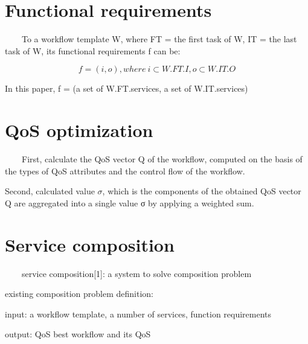 \documentclass[senior,final,11pt]{iscs-thesis}
\begin{document}


\section{Functional requirements}

~~~~To a workflow template W,  where  FT = the first task of W, IT = the last task of W, its functional requirements f can be:

\[f = (i,o), where~i \subset W.FT.I, o \subset W.IT.O \]
\begin{center}
In this paper, f = (a set of W.FT.services, a set of W.IT.services)
\end{center}


\section{QoS optimization}%
~~~~First,  calculate the QoS vector Q of the workflow, computed on the basis of the types of QoS attributes and the control flow of the workflow.

Second, calculated value $\sigma$, which is the components of the obtained QoS vector Q are aggregated into a single value σ by applying a weighted sum.


\section{Service composition}
~~~~service composition[1]: a system to solve composition problem 

existing composition problem definition:

input: a workflow template, a number of services, function requirements

output: QoS best workflow and its QoS
\end{document}
